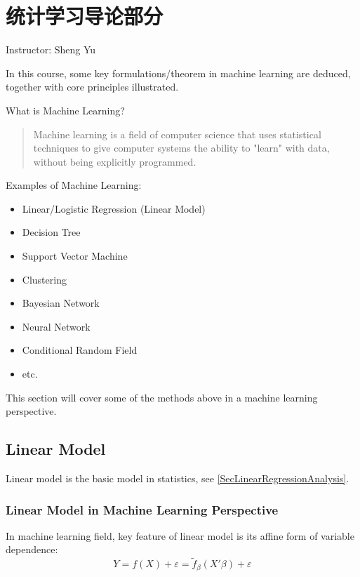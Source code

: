 \section{统计学习导论部分}
    Instructor: Sheng Yu

    In this course, some key formulations/theorem in machine learning are deduced, together with core principles illustrated.

\begin{point}
    What is Machine Learning?
\end{point}

\begin{quote}
    Machine learning is a field of computer science that uses statistical techniques to give computer systems the ability to "learn" with data, without being explicitly programmed.
\end{quote}

Examples of Machine Learning:
    \begin{itemize}[topsep=2pt,itemsep=0pt]
        \item Linear/Logistic Regression (Linear Model)
        \item Decision Tree
        \item Support Vector Machine
        \item Clustering
        \item Bayesian Network
        \item Neural Network
        \item Conditional Random Field
        \item etc.
\end{itemize}

    This section will cover some of the methods above in a machine learning perspective.

\subsection{Linear Model}
    Linear model is the basic model in statistics, see \autoref{SecLinearRegressionAnalysis}. 

\subsubsection{Linear Model in Machine Learning Perspective}
    In machine learning field, key feature of linear model is its affine form of variable dependence:
    \[
        Y=f(X)+\varepsilon = \tilde{f}_\beta (X'\beta )+\varepsilon  
    \]

